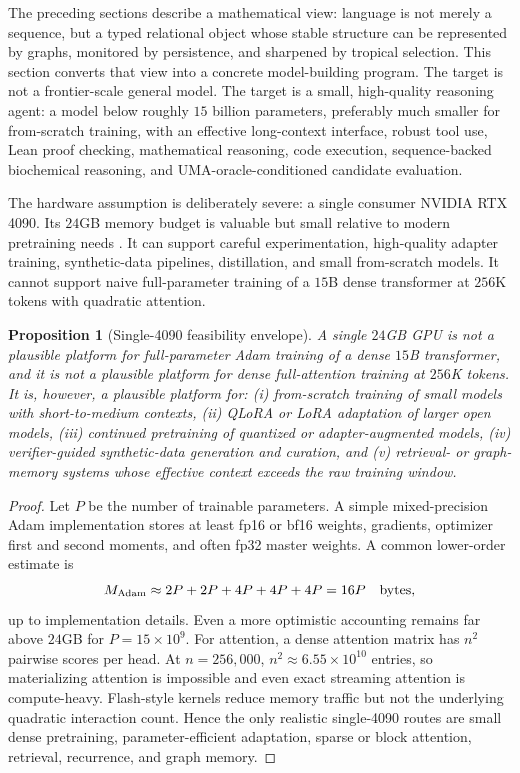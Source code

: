 \documentclass[11pt]{article}
\newtheorem{proposition}[definition]{Proposition}
\newcommand{\1}{\mathbf{1}}
\begin{document}
The preceding sections describe a mathematical view: language is not merely a sequence, but a typed relational object whose stable structure can be represented by graphs, monitored by persistence, and sharpened by tropical selection. This section converts that view into a concrete model-building program. The target is not a frontier-scale general model. The target is a small, high-quality reasoning agent: a model below roughly $15$ billion parameters, preferably much smaller for from-scratch training, with an effective long-context interface, robust tool use, Lean proof checking, mathematical reasoning, code execution, sequence-backed biochemical reasoning, and UMA-oracle-conditioned candidate evaluation.

The hardware assumption is deliberately severe: a single consumer NVIDIA RTX 4090. Its $24$GB memory budget is valuable but small relative to modern pretraining needs \cite{Nvidia4090}. It can support careful experimentation, high-quality adapter training, synthetic-data pipelines, distillation, and small from-scratch models. It cannot support naive full-parameter training of a $15$B dense transformer at $256$K tokens with quadratic attention.

\begin{proposition}[Single-4090 feasibility envelope]
\label{prop:4090-envelope}
A single $24$GB GPU is not a plausible platform for full-parameter Adam training of a dense $15$B transformer, and it is not a plausible platform for dense full-attention training at $256$K tokens. It is, however, a plausible platform for: (i) from-scratch training of small models with short-to-medium contexts, (ii) QLoRA or LoRA adaptation of larger open models, (iii) continued pretraining of quantized or adapter-augmented models, (iv) verifier-guided synthetic-data generation and curation, and (v) retrieval- or graph-memory systems whose \emph{effective} context exceeds the raw training window.
\end{proposition}

\begin{proof}
Let $P$ be the number of trainable parameters. A simple mixed-precision Adam implementation stores at least fp16 or bf16 weights, gradients, optimizer first and second moments, and often fp32 master weights. A common lower-order estimate is
\[
M_{\rm Adam}\approx 2P+2P+4P+4P+4P=16P \quad \text{bytes},
\]
up to implementation details. Even a more optimistic accounting remains far above $24$GB for $P=15\times 10^9$. For attention, a dense attention matrix has $n^2$ pairwise scores per head. At $n=256{,}000$, $n^2\approx 6.55\times 10^{10}$ entries, so materializing attention is impossible and even exact streaming attention is compute-heavy. Flash-style kernels reduce memory traffic but not the underlying quadratic interaction count. Hence the only realistic single-4090 routes are small dense pretraining, parameter-efficient adaptation, sparse or block attention, retrieval, recurrence, and graph memory. \qedhere
\end{proof}
\end{document}
